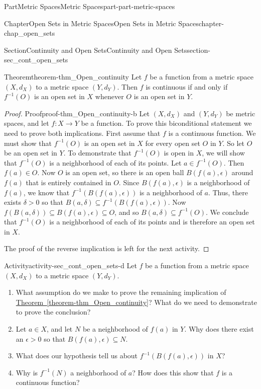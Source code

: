 \documentclass[oneside,10pt,]{book}
\newcommand{\xreffont}{\relax}
\numberwithin{equation}{chapter}
\newcommand{\gt}{>}
\begin{document}
\begin{partptx}{Part}{Metric Spaces}{}{Metric Spaces}{}{}{part-part-metric-spaces}
\begin{chapterptx}{Chapter}{Open Sets in Metric Spaces}{}{Open Sets in Metric Spaces}{}{}{chapter-chap_open_sets}
\begin{sectionptx}{Section}{Continuity and Open Sets}{}{Continuity and Open Sets}{}{}{section-sec_cont_open_sets}
\begin{theorem}{Theorem}{}{}{theorem-thm_Open_continuity}%
Let \(f\) be a function from a metric space \((X,d_X)\) to a metric space \((Y,d_Y)\). Then \(f\) is continuous if and only if \(f^{-1}(O)\) is an open set in \(X\) whenever \(O\) is an open set in \(Y\).%
\end{theorem}
\begin{proof}{Proof}{}{proof-thm_Open_continuity-b}
Let \((X, d_X)\) and \((Y,d_Y)\) be metric spaces, and let \(f : X \to Y\) be a function. To prove this biconditional statement we need to prove both implications. First assume that \(f\) is a continuous function. We must show that \(f^{-1}(O)\) is an open set in \(X\) for every open set \(O\) in \(Y\). So let \(O\) be an open set in \(Y\). To demonstrate that \(f^{-1}(O)\) is open in \(X\), we will show that \(f^{-1}(O)\) is a neighborhood of each of its points. Let \(a \in f^{-1}(O)\). Then \(f(a) \in O\). Now \(O\) is an open set, so there is an open ball \(B(f(a), \epsilon)\) around \(f(a)\) that is entirely contained in \(O\). Since \(B(f(a), \epsilon)\) is a neighborhood of \(f(a)\), we know that \(f^{-1}(B(f(a), \epsilon))\) is a neighborhood of \(a\). Thus, there exists \(\delta \gt 0\) so that \(B(a, \delta) \subseteq f^{-1}(B(f(a), \epsilon))\). Now \(f(B(a, \delta)) \subseteq B(f(a), \epsilon) \subseteq O\), and so \(B(a, \delta) \subseteq f^{-1}(O)\). We conclude that \(f^{-1}(O)\) is a neighborhood of each of its points and is therefore an open set in \(X\).%
\par
The proof of the reverse implication is left for the next activity.%
\end{proof}
\begin{activity}{Activity}{}{activity-sec_cont_open_sets-d}%
Let \(f\) be a function from a metric space \((X,d_X)\) to a metric space \((Y,d_Y)\).%
\begin{enumerate}[font=\bfseries,label=(\alph*),ref=\alph*]%
\item{}What assumption do we make to prove the remaining implication of \hyperref[theorem-thm_Open_continuity]{Theorem~{\xreffont\ref{theorem-thm_Open_continuity}}}? What do we need to demonstrate to prove the conclusion?%
\item{}Let \(a \in X\), and let \(N\) be a neighborhood of \(f(a)\) in \(Y\). Why does there exist an \(\epsilon \gt 0\) so that \(B(f(a), \epsilon) \subseteq N\).%
\item{}What does our hypothesis tell us about \(f^{-1}(B(f(a), \epsilon))\) in \(X\)?%
\item{}Why is \(f^{-1}(N)\) a neighborhood of \(a\)? How does this show that \(f\) is a continuous function?%

\end{enumerate}
\end{activity}
\end{sectionptx}
\end{chapterptx}
\end{partptx}
\end{document}
